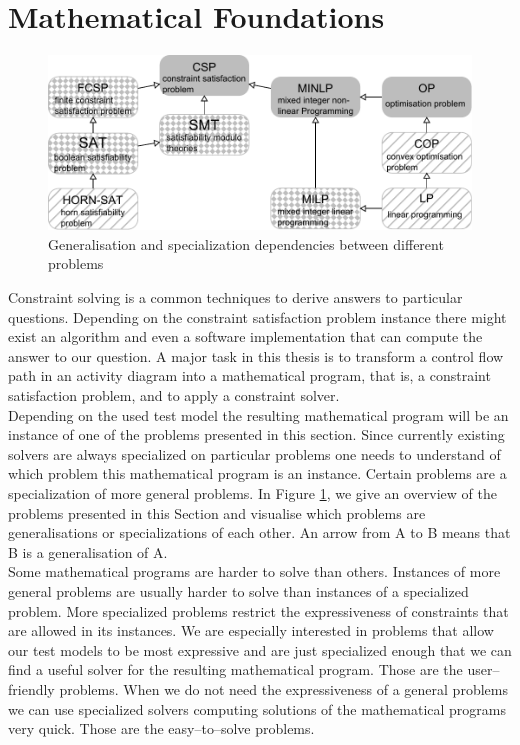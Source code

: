 \section{Mathematical Foundations}
\label{sec:Maths}
\begin{figure}
\begin{center}
\includegraphics[width=\textwidth]{./pics/ProblemLatice.pdf}
\end{center}
\caption{Generalisation and specialization dependencies between different problems}
\label{fig:problemLatice}
\end{figure}
Constraint solving is a common techniques to derive answers to particular questions. Depending on the constraint satisfaction problem instance there might exist an algorithm and even a software implementation that can compute the answer to our question. A major task in this thesis is to transform a control flow path in an activity diagram into a mathematical program, that is, a constraint satisfaction problem, and to apply a constraint solver. 
\\
Depending on the used test model the resulting mathematical program will be an instance of one of the problems presented in this section. Since currently existing solvers are always specialized on particular problems one needs to understand of which problem this mathematical program is an instance. Certain problems are a specialization of more general problems. In Figure \ref{fig:problemLatice}, we give an overview of the problems presented in this Section and visualise which problems are generalisations or specializations of each other. An arrow from \textsf{A} to \textsf{B} means that \textsf{B} is a generalisation of \textsf{A}.\\
Some mathematical programs are harder to solve than others. Instances of more general problems are usually harder to solve than instances of a specialized problem. More specialized problems restrict the expressiveness of constraints that are allowed in its instances. We are especially interested in problems that allow our test models to be most expressive and are just specialized enough that we can find a useful solver for the resulting mathematical program. Those are the user--friendly problems. When we do not need the expressiveness of a general problems we can use specialized solvers computing solutions of the mathematical programs very quick. Those are the easy--to--solve problems.\\
